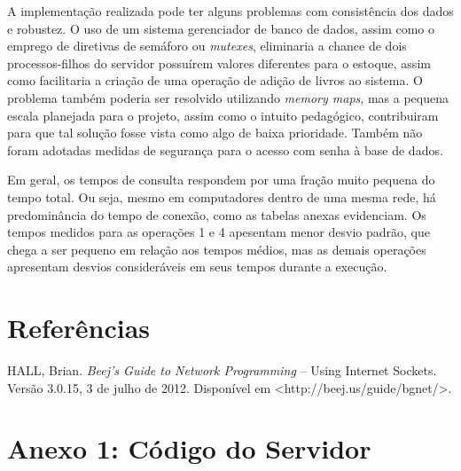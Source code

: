 \documentclass[11pt, brazil]{article} %
\begin{document}
A implementação realizada pode ter alguns problemas com consistência dos dados e robustez. 
O uso de um sistema gerenciador de banco de dados, assim como o emprego de diretivas de semáforo ou \emph{mutexes}, eliminaria a chance de dois processos-filhos do servidor possuírem valores diferentes para o estoque, assim como facilitaria a criação de uma operação de adição de livros ao sistema. 
O problema também poderia ser resolvido utilizando \emph{memory maps}, mas a pequena escala planejada para o projeto, assim como o intuito pedagógico, contribuiram para que tal solução fosse vista como algo de baixa prioridade. 
Também não foram adotadas medidas de segurança para o acesso com senha à base de dados.

Em geral, os tempos de consulta respondem por uma fração muito pequena do tempo total. Ou seja, mesmo em computadores dentro de uma mesma rede, há predominância do tempo de conexão, como as tabelas anexas evidenciam. Os tempos medidos para as operações 1 e 4 apesentam menor desvio padrão, que chega a ser pequeno em relação aos tempos médios, mas as demais operações apresentam desvios consideráveis em seus tempos durante a execução.

\section{Referências}

HALL, Brian. \emph{Beej's Guide to Network Programming} -- Using Internet Sockets. Versão 3.0.15, 3 de julho de 2012. Disponível em <http://beej.us/guide/bgnet/>.

\section*{Anexo 1: Código do Servidor}
\end{document}
